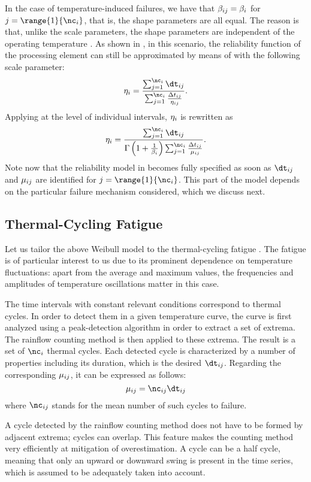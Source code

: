 In the case of temperature-induced failures, we have that $\beta_{ij} =
\beta_i$ for $j = \range{1}{\nc_i}$, that is, the shape parameters are all
equal. The reason is that, unlike the scale parameters, the shape parameters are
independent of the operating temperature \cite{chang2006}. As shown in
\cite{xiang2010}, in this scenario, the reliability function of the processing
element can still be approximated by means of  with
the following scale parameter:
\[
  \scale_i = \frac{\sum_{j = 1}^{\nc_i} \dt_{ij}}{\sum_{j = 1}^{\nc_i} \frac{\Delta t_{ij}}{\scale_{ij}}}.
\]
Applying  at the level of individual intervals,
$\eta_i$ is rewritten as
\[
  \scale_i = \frac{\sum_{j = 1}^{\nc_i} \dt_{ij}}{\Gamma\left(1 + \frac{1}{\shape_i}\right) \sum_{j = 1}^{\nc_i} \frac{\Delta t_{ij}}{\mean_{ij}}}.
\]
Note now that the reliability model in  becomes fully
specified as soon as $\dt_{ij}$ and $\mu_{ij}$ are identified for $j =
\range{1}{\nc_i}$. This part of the model depends on the particular failure
mechanism considered, which we discuss next.

\subsection{Thermal-Cycling Fatigue}

Let us tailor the above Weibull model to the thermal-cycling fatigue
\cite{jedec2016}. The fatigue is of particular interest to us due to its
prominent dependence on temperature fluctuations: apart from the average and
maximum values, the frequencies and amplitudes of temperature oscillations
matter in this case.

The time intervals with constant relevant conditions correspond to thermal
cycles. In order to detect them in a given temperature curve, the curve is first
analyzed using a peak-detection algorithm in order to extract a set of extrema.
The rainflow counting method \cite{xiang2010} is then applied to these extrema.
The result is a set of $\nc_i$ thermal cycles. Each detected cycle is
characterized by a number of properties including its duration, which is the
desired $\dt_{ij}$. Regarding the corresponding $\mu_{ij}$, it can be
expressed as follows:
\[
  \mean_{ij} = \nc_{ij} \dt_{ij}
\]
where $\nc_{ij}$ stands for the mean number of such cycles to failure.

\begin{remark}
A cycle detected by the rainflow counting method does not have to be formed by
adjacent extrema; cycles can overlap. This feature makes the counting method
very efficiently at mitigation of overestimation. A cycle can be a half cycle,
meaning that only an upward or downward swing is present in the time series,
which is assumed to be adequately taken into account.
\end{remark}

